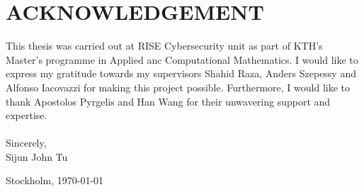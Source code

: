 \thispagestyle{empty}
\section*{ACKNOWLEDGEMENT}

This thesis was carried out at RISE Cybersecurity unit as part of KTH's Master's programme in Applied anc Computational Mathematics. I would like to express my gratitude towards my supervisors Shahid Raza, Anders Szepessy and Alfonso Iacovazzi for making this project possible. Furthermore, I would like to thank Apostolos Pyrgelis and Han Wang for their unwavering support and expertise.\\
\\[2cm]

Sincerely,
\\[1cm]

Sijun John Tu

Stockholm, \today


